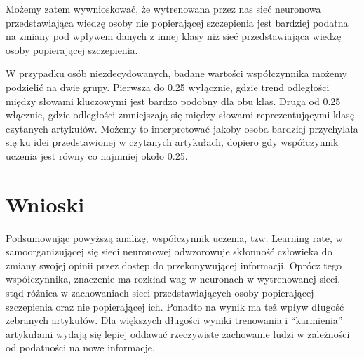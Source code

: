 \documentclass[11pt]{article}
\begin{document}
Możemy zatem wywnioskować, że wytrenowana przez nas sieć neuronowa przedstawiająca wiedzę osoby nie popierającej szczepienia jest bardziej podatna na zmiany pod wpływem danych z innej klasy niż sieć przedstawiająca wiedzę osoby popierającej szczepienia.

W przypadku osób niezdecydowanych, badane wartości współczynnika możemy podzielić na dwie grupy. Pierwsza do 0.25 wyłącznie, gdzie trend odległości między słowami kluczowymi jest bardzo podobny dla obu klas. Druga od 0.25 włącznie, gdzie odległości zmniejszają się między słowami reprezentującymi klasę czytanych artykułów. Możemy to interpretować jakoby osoba bardziej przychylała się ku idei przedstawionej w czytanych artykułach, dopiero gdy współczynnik uczenia jest równy co najmniej około 0.25.


    \section*{Wnioski}

    Podsumowując powyższą analizę, współczynnik uczenia, tzw. Learning rate, w samoorganizującej się sieci neuronowej odwzorowuje skłonność człowieka do zmiany swojej opinii przez dostęp do przekonywującej informacji. Oprócz tego współczynnika, znaczenie ma rozkład wag w neuronach w wytrenowanej sieci, stąd różnica w zachowaniach sieci przedstawiających osoby popierającej szczepienia oraz nie popierającej ich. Ponadto na wynik ma też wpływ długość zebranych artykułów. Dla większych długości wyniki trenowania i “karmienia” artykułami wydają się lepiej oddawać rzeczywiste zachowanie ludzi w zależności od podatności na nowe informacje.
\end{document}
